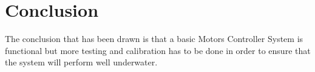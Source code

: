 \section{Conclusion}\label{sec:conclusion}
 The conclusion that has been drawn is that a basic Motors Controller System is functional but more testing and calibration has to be done in order to ensure that the system will perform well underwater.